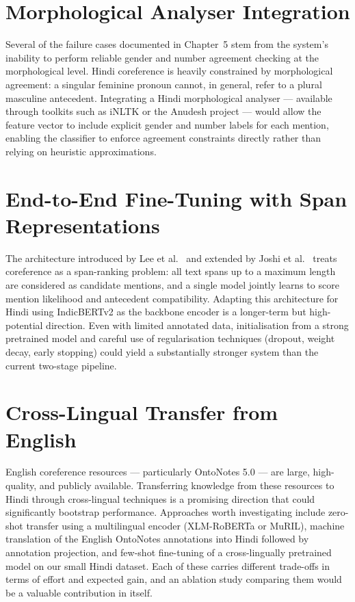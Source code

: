 \documentclass[12pt,a4paper]{report}
\begin{document}
\section{Morphological Analyser Integration}

Several of the failure cases documented in Chapter~5 stem from the system's inability to perform reliable gender and number agreement checking at the morphological level. Hindi coreference is heavily constrained by morphological agreement: a singular feminine pronoun cannot, in general, refer to a plural masculine antecedent. Integrating a Hindi morphological analyser --- available through toolkits such as iNLTK or the Anudesh project --- would allow the feature vector to include explicit gender and number labels for each mention, enabling the classifier to enforce agreement constraints directly rather than relying on heuristic approximations.

\section{End-to-End Fine-Tuning with Span Representations}

The architecture introduced by Lee et al.\ \cite{lee2017end} and extended by Joshi et al.\ \cite{joshi2019bert} treats coreference as a span-ranking problem: all text spans up to a maximum length are considered as candidate mentions, and a single model jointly learns to score mention likelihood and antecedent compatibility. Adapting this architecture for Hindi using IndicBERTv2 as the backbone encoder is a longer-term but high-potential direction. Even with limited annotated data, initialisation from a strong pretrained model and careful use of regularisation techniques (dropout, weight decay, early stopping) could yield a substantially stronger system than the current two-stage pipeline.

\section{Cross-Lingual Transfer from English}

English coreference resources --- particularly OntoNotes 5.0 --- are large, high-quality, and publicly available. Transferring knowledge from these resources to Hindi through cross-lingual techniques is a promising direction that could significantly bootstrap performance. Approaches worth investigating include zero-shot transfer using a multilingual encoder (XLM-RoBERTa or MuRIL), machine translation of the English OntoNotes annotations into Hindi followed by annotation projection, and few-shot fine-tuning of a cross-lingually pretrained model on our small Hindi dataset. Each of these carries different trade-offs in terms of effort and expected gain, and an ablation study comparing them would be a valuable contribution in itself.
\end{document}
